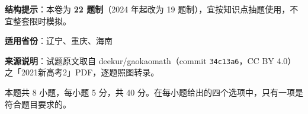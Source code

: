 

\begin{gknotice}
\textbf{结构提示}：本卷为 \textbf{22 题制}（2024 年起改为 19 题制），宜按知识点抽题使用，不宜整套限时模拟。

\textbf{适用省份}：辽宁、重庆、海南

\textbf{来源说明}：试题原文取自 deekur/gaokaomath（commit \texttt{34c13a6}，CC BY 4.0）之「2021新高考2」PDF，逐题照图转录。
\end{gknotice}

\par\medskip


\begin{gktip}
本题共 8 小题，每小题 5 分，共 40 分。在每小题给出的四个选项中，只有一项是符合题目要求的。
\end{gktip}

